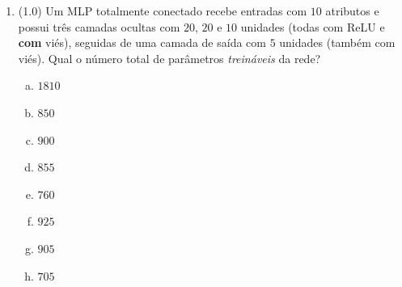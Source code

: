 \documentclass[11pt,a4paper]{article}
\begin{document}
\begin{enumerate}[1)]
\textbf{II.} O momentum acumula uma média móvel exponencial dos gradientes; com $\beta = 0$, a atualização reduz-se à descida de gradiente padrão.

\textbf{III.} No AdaGrad, o acumulador de gradientes ao quadrado cresce monotonicamente, de modo que a taxa de aprendizado efetiva por parâmetro tende a diminuir ao longo do treinamento.

\textbf{IV.} O momentum de Nesterov avalia o gradiente na posição atual $\theta_t$.

\textbf{V.} Em Adam, a correção de viés ($\hat{m}_t = m_t/(1-\beta_1^{t})$ e $\hat{v}_t = v_t/(1-\beta_2^{t})$) torna-se progressivamente mais relevante à medida que $t$ cresce, pois os denominadores $1-\beta_1^{t}$ e $1-\beta_2^{t}$ se afastam cada vez mais de $1$.

\begin{enumerate}[a)]
    \item Apenas I, III e V estão corretas.
    \item Apenas I, II, III e IV estão corretas.
    \item Apenas II, III e IV estão corretas.
    \item Apenas I e III estão corretas.
    \item Apenas I, II e III estão corretas.
    \item Apenas I, II e V estão corretas.
    \item Todas as afirmações estão corretas.
    \item Apenas III e V estão corretas.
\end{enumerate}

\item (1.0) Um MLP totalmente conectado recebe entradas com $10$ atributos e possui três camadas ocultas com $20$, $20$ e $10$ unidades (todas com ReLU e \textbf{com} viés), seguidas de uma camada de saída com $5$ unidades (também com viés). Qual o número total de parâmetros \emph{treináveis} da rede?

\begin{enumerate}[a)]
    \item $1810$
    \item $850$
    \item $900$
    \item $855$
    \item $760$
    \item $925$
    \item $905$
    \item $705$
\end{enumerate}


\end{enumerate}
\end{document}
